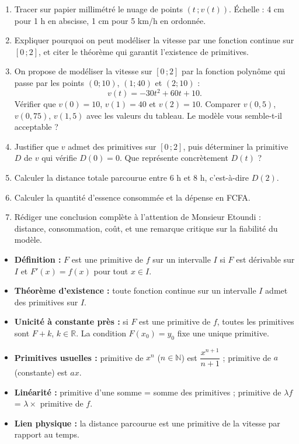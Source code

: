 \documentclass[11pt]{article}
\newcommand{\cle}[1]{{\popxbold\color{popdark}#1}}
\newcounter{popsec}
\newcounter{popsub}
\newcommand{\courssub}[1]{%
  \stepcounter{popsub}%
  \par\vspace{9pt}\noindent{\popxbold\fontsize{11.5}{13}\selectfont\color{popink}{\color{poporange}\thepopsec.\thepopsub}\hspace{6pt}#1}\par\nopagebreak\vspace{4pt}
}
\begin{document}
\begin{enumerate}
\item Tracer sur papier millimétré le nuage de points $(t\,;v(t))$. Échelle : 4 cm pour 1 h en abscisse, 1 cm pour 5 km/h en ordonnée.
\item Expliquer pourquoi on peut modéliser la vitesse par une fonction \cle{continue} sur $[0\,;2]$, et citer le théorème qui garantit l'existence de primitives.
\item On propose de modéliser la vitesse sur $[0\,;2]$ par la fonction polynôme qui passe par les points $(0;10)$, $(1;40)$ et $(2;10)$ :
\[ v(t) = -30t^2 + 60t + 10. \]
Vérifier que $v(0)=10$, $v(1)=40$ et $v(2)=10$. Comparer $v(0,5)$, $v(0,75)$, $v(1,5)$ avec les valeurs du tableau. Le modèle vous semble-t-il acceptable ?
\item Justifier que $v$ admet des primitives sur $[0\,;2]$, puis déterminer la primitive $D$ de $v$ qui vérifie $D(0)=0$. Que représente concrètement $D(t)$ ?
\item Calculer la distance totale parcourue entre 6 h et 8 h, c'est-à-dire $D(2)$.
\item Calculer la quantité d'essence consommée et la dépense en FCFA.
\item Rédiger une conclusion complète à l'attention de Monsieur Etoundi : distance, consommation, coût, et une remarque critique sur la fiabilité du modèle.
\end{enumerate}

\courssub{Ressources à mobiliser}

\begin{aretenir}
\begin{itemize}
\item \textbf{Définition :} $F$ est une primitive de $f$ sur un intervalle $I$ si $F$ est dérivable sur $I$ et $F'(x)=f(x)$ pour tout $x \in I$.
\item \textbf{Théorème d'existence :} toute fonction \cle{continue} sur un intervalle $I$ admet des primitives sur $I$.
\item \textbf{Unicité à constante près :} si $F$ est une primitive de $f$, toutes les primitives sont $F+k$, $k\in\mathbb{R}$. La condition $F(x_0)=y_0$ fixe une unique primitive.
\item \textbf{Primitives usuelles :} primitive de $x^n$ ($n\in\mathbb{N}$) est $\dfrac{x^{n+1}}{n+1}$ ; primitive de $a$ (constante) est $ax$.
\item \textbf{Linéarité :} primitive d'une somme = somme des primitives ; primitive de $\lambda f$ = $\lambda \times$ primitive de $f$.
\item \textbf{Lien physique :} la distance parcourue est une primitive de la vitesse par rapport au temps.
\end{itemize}
\end{aretenir}
\end{document}
